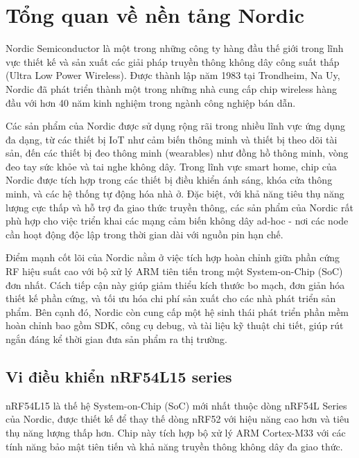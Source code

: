 \section{Tổng quan về nền tảng Nordic}
\label{sec:nordic}

Nordic Semiconductor là một trong những công ty hàng đầu thế giới trong lĩnh vực thiết kế và sản xuất các giải pháp truyền thông không dây công suất thấp (Ultra Low Power Wireless). Được thành lập năm 1983 tại Trondheim, Na Uy, Nordic đã phát triển thành một trong những nhà cung cấp chip wireless hàng đầu với hơn 40 năm kinh nghiệm trong ngành công nghiệp bán dẫn.

Các sản phẩm của Nordic được sử dụng rộng rãi trong nhiều lĩnh vực ứng dụng đa dạng, từ các thiết bị IoT như cảm biến thông minh và thiết bị theo dõi tài sản, đến các thiết bị đeo thông minh (wearables) như đồng hồ thông minh, vòng đeo tay sức khỏe và tai nghe không dây. Trong lĩnh vực smart home, chip của Nordic được tích hợp trong các thiết bị điều khiển ánh sáng, khóa cửa thông minh, và các hệ thống tự động hóa nhà ở. Đặc biệt, với khả năng tiêu thụ năng lượng cực thấp và hỗ trợ đa giao thức truyền thông, các sản phẩm của Nordic rất phù hợp cho việc triển khai các mạng cảm biến không dây ad-hoc - nơi các node cần hoạt động độc lập trong thời gian dài với nguồn pin hạn chế.

Điểm mạnh cốt lõi của Nordic nằm ở việc tích hợp hoàn chỉnh giữa phần cứng RF hiệu suất cao với bộ xử lý ARM tiên tiến trong một System-on-Chip (SoC) đơn nhất. Cách tiếp cận này giúp giảm thiểu kích thước bo mạch, đơn giản hóa thiết kế phần cứng, và tối ưu hóa chi phí sản xuất cho các nhà phát triển sản phẩm. Bên cạnh đó, Nordic còn cung cấp một hệ sinh thái phát triển phần mềm hoàn chỉnh bao gồm SDK, công cụ debug, và tài liệu kỹ thuật chi tiết, giúp rút ngắn đáng kể thời gian đưa sản phẩm ra thị trường.

\subsection{Vi điều khiển nRF54L15 series}

nRF54L15 là thế hệ System-on-Chip (SoC) mới nhất thuộc dòng nRF54L Series của Nordic, được thiết kế để thay thế dòng nRF52 với hiệu năng cao hơn và tiêu thụ năng lượng thấp hơn. Chip này tích hợp bộ xử lý ARM Cortex-M33 với các tính năng bảo mật tiên tiến và khả năng truyền thông không dây đa giao thức.

